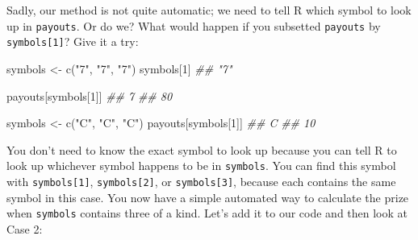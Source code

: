 \documentclass[
  letterpaper,
  DIV=11,
  numbers=noendperiod]{scrbook}
\newenvironment{Shaded}{\begin{snugshade}}{\end{snugshade}}
\newcommand{\DecValTok}[1]{\textcolor[rgb]{0.68,0.00,0.00}{#1}}
\newcommand{\DocumentationTok}[1]{\textcolor[rgb]{0.37,0.37,0.37}{\textit{#1}}}
\newcommand{\FunctionTok}[1]{\textcolor[rgb]{0.28,0.35,0.67}{#1}}
\newcommand{\NormalTok}[1]{\textcolor[rgb]{0.00,0.23,0.31}{#1}}
\newcommand{\OtherTok}[1]{\textcolor[rgb]{0.00,0.23,0.31}{#1}}
\newcommand{\StringTok}[1]{\textcolor[rgb]{0.13,0.47,0.30}{#1}}
\begin{document}
Sadly, our method is not quite automatic; we need to tell R which symbol
to look up in \texttt{payouts}. Or do we? What would happen if you
subsetted \texttt{payouts} by \texttt{symbols{[}1{]}}? Give it a try:

\begin{Shaded}
\begin{Highlighting}[]
\NormalTok{symbols }\OtherTok{\textless{}{-}} \FunctionTok{c}\NormalTok{(}\StringTok{"7"}\NormalTok{, }\StringTok{"7"}\NormalTok{, }\StringTok{"7"}\NormalTok{)}
\NormalTok{symbols[}\DecValTok{1}\NormalTok{]}
\DocumentationTok{\#\# "7"}

\NormalTok{payouts[symbols[}\DecValTok{1}\NormalTok{]]}
\DocumentationTok{\#\#  7 }
\DocumentationTok{\#\# 80 }

\NormalTok{symbols }\OtherTok{\textless{}{-}} \FunctionTok{c}\NormalTok{(}\StringTok{"C"}\NormalTok{, }\StringTok{"C"}\NormalTok{, }\StringTok{"C"}\NormalTok{)}
\NormalTok{payouts[symbols[}\DecValTok{1}\NormalTok{]]}
\DocumentationTok{\#\#  C }
\DocumentationTok{\#\# 10 }
\end{Highlighting}
\end{Shaded}

You don't need to know the exact symbol to look up because you can tell
R to look up whichever symbol happens to be in \texttt{symbols}. You can
find this symbol with \texttt{symbols{[}1{]}}, \texttt{symbols{[}2{]}},
or \texttt{symbols{[}3{]}}, because each contains the same symbol in
this case. You now have a simple automated way to calculate the prize
when \texttt{symbols} contains three of a kind. Let's add it to our code
and then look at Case 2:
\end{document}
